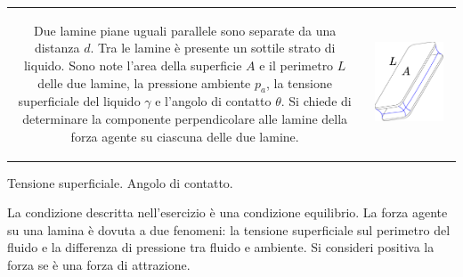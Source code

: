 \noindent
\begin{tabular}{cc}
\begin{minipage}[b]{0.60\textwidth}
\begin{exerciseS}
Due lamine piane uguali parallele sono separate da una distanza $d$. Tra le lamine è 
presente un sottile strato di liquido. Sono note l'area della superficie $A$ e il perimetro $L$ delle due lamine,
la pressione ambiente $p_a$, la tensione superficiale del liquido $\gamma$ e l'angolo di contatto $\theta$.
Si chiede di determinare la componente perpendicolare alle lamine della forza agente su ciascuna delle due lamine.
\end{exerciseS}
\end{minipage}
&
\begin{minipage}{0.35\textwidth}
   \begin{center}
   \includegraphics[width=0.85\textwidth]{./fig/Plates4}
   \end{center}
\end{minipage}
\end{tabular}

\sol

\partone
 Tensione superficiale. Angolo di contatto.

\parttwo
 La condizione descritta nell'esercizio è una condizione equilibrio. La forza agente su una lamina
è dovuta a due fenomeni: la tensione superficiale sul perimetro del fluido e la differenza di pressione tra fluido 
e ambiente. Si consideri positiva la forza se è una forza di attrazione.

